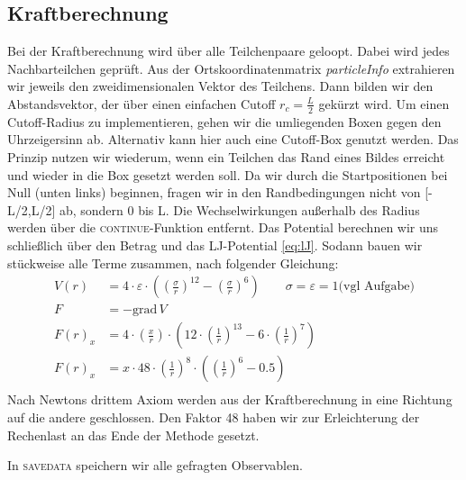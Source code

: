 \subsection*{Kraftberechnung}
Bei der Kraftberechnung wird über alle Teilchenpaare geloopt. Dabei wird jedes Nachbarteilchen geprüft. Aus der Ortskoordinatenmatrix \textit{particleInfo} extrahieren wir jeweils den zweidimensionalen Vektor des Teilchens. Dann bilden wir den Abstandsvektor, der über einen einfachen Cutoff $r_c = \frac{L}{2}$ gekürzt wird. Um einen Cutoff-Radius zu implementieren, gehen wir die umliegenden Boxen gegen den Uhrzeigersinn ab. Alternativ kann hier auch eine Cutoff-Box genutzt werden. Das Prinzip nutzen wir wiederum, wenn ein Teilchen das Rand eines Bildes erreicht und wieder in die Box gesetzt werden soll. Da wir durch die Startpositionen bei Null (unten links) beginnen, fragen wir in den Randbedingungen nicht von [-L/2,L/2] ab, sondern 0 bis L.
Die Wechselwirkungen außerhalb des Radius werden über die \textsc{continue}-Funktion entfernt. Das Potential berechnen wir uns schließlich über den Betrag und das LJ-Potential \eqref{eq:lJ}. Sodann bauen wir stückweise alle Terme zusammen, nach folgender Gleichung:
\begin{equation*}
\begin{split}
	V(r) &= 4\cdot \varepsilon \cdot \left( \left( \frac{\sigma}{r} \right)^12 - \left( \frac{\sigma}{r} \right)^6 \right) \qquad \sigma = \varepsilon = 1 \text{(vgl Aufgabe)} \\
		F &= -\text{grad} \,V\\
        F(r)_x &= 4 \cdot \left(\frac{x}{r}\right) \cdot \left(12\cdot\left(\frac{1}{r}\right)^{13} - 6\cdot\left(\frac{1}{r}\right)^7\right) \\
            F(r)_x &= x \cdot 48 \cdot \left( \frac{1}{r} \right)^8 \cdot \left(\left(\frac{1}{r}\right)^6 - 0.5\right) \\
\end{split}
\end{equation*}
Nach Newtons drittem Axiom werden aus der Kraftberechnung in eine Richtung auf die andere geschlossen. Den Faktor 48 haben wir zur Erleichterung der Rechenlast an das Ende der Methode gesetzt.

In \textsc{savedata} speichern wir alle gefragten Observablen.

